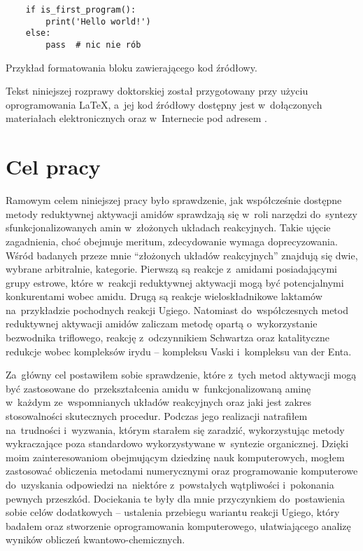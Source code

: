 \begin{listing}
  \begin{lstlisting}
    if is_first_program():
        print('Hello world!')
    else:
        pass  # nic nie rób
  \end{lstlisting}
\caption{Przykład formatowania bloku zawierającego kod źródłowy.}
\label{lst:example}
\end{listing}

Tekst niniejszej rozprawy doktorskiej został przygotowany przy użyciu oprogramowania \LaTeX,
  a~jej kod źródłowy dostępny jest w~dołączonych materiałach elektronicznych
  oraz w~Internecie pod adresem \repourl{}.

\section{Cel pracy}\label{intro:goal}
Ramowym celem niniejszej pracy było sprawdzenie, jak współcześnie dostępne metody
  reduktywnej aktywacji amidów sprawdzają się w~roli narzędzi do~syntezy
  sfunkcjonalizowanych amin w~złożonych układach reakcyjnych.
Takie ujęcie zagadnienia, choć obejmuje meritum, zdecydowanie wymaga doprecyzowania.
Wśród badanych przeze mnie \enquote{złożonych układów reakcyjnych} znajdują się dwie,
  wybrane arbitralnie, kategorie.
Pierwszą są reakcje z~amidami posiadającymi grupy estrowe, które w~reakcji reduktywnej aktywacji
  mogą być potencjalnymi konkurentami wobec amidu.
Drugą są reakcje wieloskładnikowe laktamów na~przykładzie pochodnych reakcji Ugiego.
Natomiast do~współczesnych metod reduktywnej aktywacji amidów zaliczam metodę opartą
  o~wykorzystanie bezwodnika triflowego, reakcję z~odczynnikiem Schwartza oraz katalityczne
  redukcje wobec kompleksów irydu \--- kompleksu Vaski i~kompleksu van der Enta.

Za~główny cel postawiłem sobie sprawdzenie, które z~tych metod aktywacji mogą być zastosowane
  do~przekształcenia amidu w~funkcjonalizowaną aminę w~każdym ze~wspomnianych układów
  reakcyjnych oraz jaki jest zakres stosowalności skutecznych procedur.
Podczas jego realizacji natrafiłem na~trudności i~wyzwania, którym starałem się zaradzić,
  wykorzystując metody wykraczające poza standardowo wykorzystywane w~syntezie organicznej.
Dzięki moim zainteresowaniom obejmującym dziedzinę nauk komputerowych,
  mogłem zastosować obliczenia metodami numerycznymi oraz programowanie komputerowe
  do~uzyskania odpowiedzi na~niektóre z~powstałych wątpliwości i~pokonania pewnych przeszkód.
Dociekania te były dla mnie przyczynkiem do~postawienia sobie celów dodatkowych \---
  ustalenia przebiegu wariantu reakcji Ugiego, który badałem oraz stworzenie oprogramowania
  komputerowego, ułatwiającego analizę wyników obliczeń kwantowo-chemicznych.

